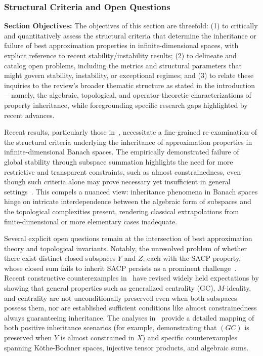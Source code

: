 \documentclass[sigconf]{acmart}
\begin{document}
\subsubsection{Structural Criteria and Open Questions}

\textbf{Section Objectives:} The objectives of this section are threefold: (1) to critically and quantitatively assess the structural criteria that determine the inheritance or failure of best approximation properties in infinite-dimensional spaces, with explicit reference to recent stability/instability results; (2) to delineate and catalog open problems, including the metrics and structural parameters that might govern stability, instability, or exceptional regimes; and (3) to relate these inquiries to the review's broader thematic structure as stated in the introduction—namely, the algebraic, topological, and operator-theoretic characterizations of property inheritance, while foregrounding specific research gaps highlighted by recent advances.

Recent results, particularly those in~\cite{ref103}, necessitate a fine-grained re-examination of the structural criteria underlying the inheritance of approximation properties in infinite-dimensional Banach spaces. The empirically demonstrated failure of global stability through subspace summation highlights the need for more restrictive and transparent constraints, such as almost constrainedness, even though such criteria alone may prove necessary yet insufficient in general settings~\cite{ref103}. This compels a nuanced view: inheritance phenomena in Banach spaces hinge on intricate interdependence between the algebraic form of subspaces and the topological complexities present, rendering classical extrapolations from finite-dimensional or more elementary cases inadequate.

Several explicit open questions remain at the intersection of best approximation theory and topological invariants. Notably, the unresolved problem of whether there exist distinct closed subspaces $Y$ and $Z$, each with the SACP property, whose closed sum fails to inherit SACP persists as a prominent challenge~\cite{ref103}. Recent constructive counterexamples in~\cite{ref103} have revised widely held expectations by showing that general properties such as generalized centrality (GC), $M$-ideality, and centrality are not unconditionally preserved even when both subspaces possess them, nor are established sufficient conditions like almost constrainedness always guaranteeing inheritance. The analyses in~\cite{ref103} provide a detailed mapping of both positive inheritance scenarios (for example, demonstrating that $(GC)$ is preserved when $Y$ is almost constrained in $X$) and specific counterexamples spanning K\"othe-Bochner spaces, injective tensor products, and algebraic sums.
\end{document}
